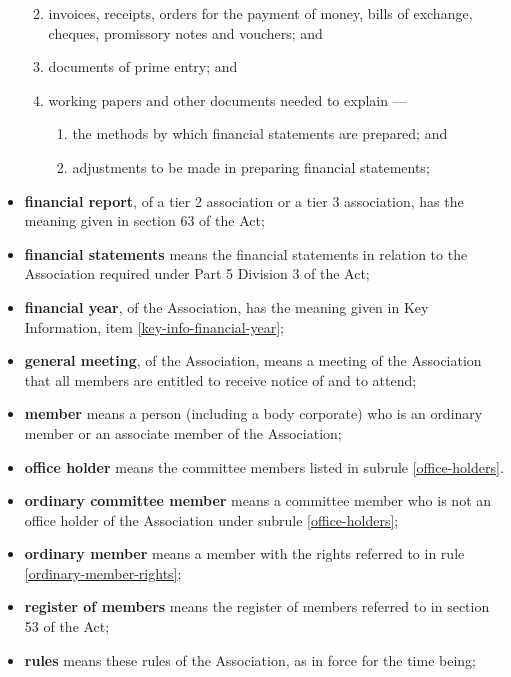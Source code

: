 \documentclass[../constitution.tex]{subfiles}
\begin{document}
\begin{itemize}[label={-}]
  \begin{enumerate}
    \def\labelenumi{\alph{enumi})}
    \setcounter{enumi}{0}
  
  \item invoices, receipts, orders for the payment of money, bills of exchange, cheques, promissory notes and vouchers; and
  \item documents of prime entry; and
  \item working papers and other documents needed to explain ---
    \begin{enumerate}
    \def\labelenumi{\roman{enumi})}
    \setcounter{enumi}{0}
    \item the methods by which financial statements are prepared; and
    \item adjustments to be made in preparing financial statements; 
    \end{enumerate}
  \end{enumerate}
\item \textbf{financial report}, of a tier 2 association or a tier 3 association, has the meaning given in section 63 of the Act;
\item \textbf{financial statements} means the financial statements in relation to the Association required under Part 5 Division 3 of the Act;
\item \textbf{financial year}, of the Association, has the meaning given in Key Information, item \ref{key-info-financial-year};
\item \textbf{general meeting}, of the Association, means a meeting of the Association that all members are entitled to receive notice of and to attend;
\item \textbf{member} means a person (including a body corporate) who is an ordinary member or an associate member of the Association;
\item \textbf{office holder} means the committee members listed in subrule \ref{office-holders}.
\item \textbf{ordinary committee member} means a committee member who is not an office holder of the Association under subrule \ref{office-holders};
\item \textbf{ordinary member} means a member with the rights referred to in rule \ref{ordinary-member-rights};
\item \textbf{register of members} means the register of members referred to in section 53 of the Act;
\item \textbf{rules} means these rules of the Association, as in force for the time being;

\end{itemize}
\end{document}
